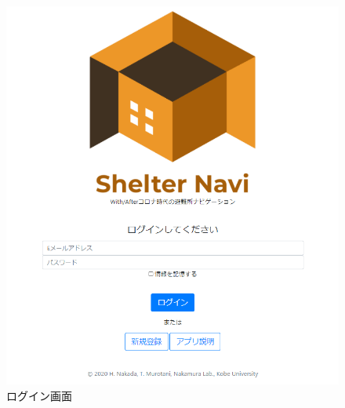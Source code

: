 \documentclass[technicalreport,dvipdfmx]{ieicej}
\begin{document}
\begin{figure}[htbp]
     \begin{center}
          \includegraphics[scale=0.5,pagebox=cropbox,clip]{img/login.png}
          \caption{ログイン画面}
          \label{fig:login}
     \end{center}
\end{figure}
\end{document}
